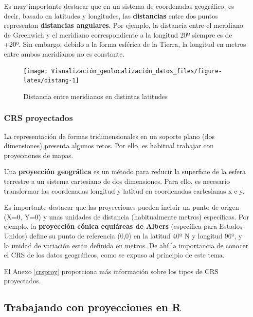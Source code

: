 \documentclass[
]{book}
\theoremstyle{definition}
\theoremstyle{definition}
\theoremstyle{definition}
\theoremstyle{definition}
\theoremstyle{remark}
\begin{document}
Es muy importante destacar que en un sistema de coordenadas geográfico, es
decir, basado en latitudes y longitudes, las \textbf{distancias} entre dos puntos
representan \textbf{distancias angulares}. Por ejemplo, la distancia entre el
meridiano de Greenwich y el meridiano correspondiente a la longitud 20º siempre
es de +20º. Sin embargo, debido a la forma esférica de la Tierra, la longitud en
metros entre ambos meridianos no es constante.

\begin{figure}

{\centering \texttt{[image: Visualización\_geolocalización\_datos\_files/figure-latex/distang-1]} 

}

\caption{Distancia entre meridianos en distintas latitudes}\label{fig:distang}
\end{figure}

\hypertarget{crs-proyectados}{%
\subsubsection{CRS proyectados}\label{crs-proyectados}}

La representación de formas tridimensionales en un soporte plano (dos
dimensiones) presenta algunos retos. Por ello, es habitual trabajar con
proyecciones de mapas.

Una \textbf{proyección geográfica} es un método para reducir la superficie de la
esfera terrestre a un sistema cartesiano de dos dimensiones. Para ello, es
necesario transformar las coordenadas longitud y latitud en coordenadas
cartesianas x e y.

Es importante destacar que las proyecciones pueden incluir un punto de origen
(X=0, Y=0) y unas unidades de distancia (habitualmente metros) específicas. Por
ejemplo, la \textbf{proyección cónica equiáreas de Albers} (específica para Estados
Unidos) define su punto de referencia (0,0) en la latitud 40º N y longitud 96º,
y la unidad de variación están definida en metros. De ahí la importancia de
conocer el CRS de los datos geográficos, como se expuso al principio de este
tema.

El Anexo \ref{crsproy} proporciona más información sobre los tipos de CRS
proyectados.

\hypertarget{trabajando-con-proyecciones-en-r}{%
\subsection{\texorpdfstring{Trabajando con proyecciones en \textbf{R}}{Trabajando con proyecciones en R}}\label{trabajando-con-proyecciones-en-r}}
\end{document}
